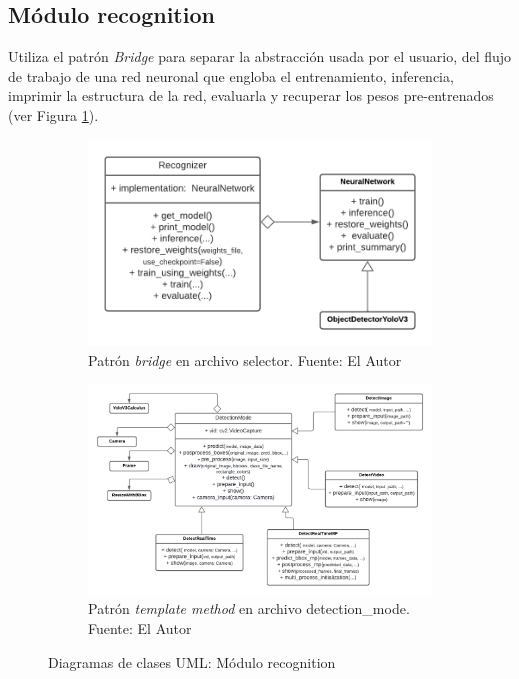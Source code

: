 \subsection{Módulo recognition}
Utiliza el patrón \textit{Bridge} para separar la abstracción usada por el usuario, del flujo de trabajo de una red neuronal que engloba el entrenamiento, inferencia, imprimir la estructura de la red, evaluarla y recuperar los pesos pre-entrenados (ver Figura \ref{bridge_uml}).
\begin{figure}[H]
     \centering
     \begin{subfigure}[b]{0.4\textwidth}
        \centering
        \includegraphics[scale=0.33]{Recursos/bridge_uml.png}
        \caption[Patrón \textit{bridge} en archivo selector.]{Patrón \textit{bridge} en archivo selector. {\footnotesize Fuente: El Autor}}
        \label{bridge_uml}
     \end{subfigure}
     \hspace{0.05em}
     \begin{subfigure}[b]{0.4\textwidth}
         \centering
        \includegraphics[scale=0.33]{Recursos/template_method_uml.png}
        \caption[Patrón \textit{template method} en archivo detection\_mode.]{Patrón \textit{template method} en archivo detection\_mode. {\footnotesize Fuente: El Autor}}
        \label{template_method_uml}
     \end{subfigure}
     \hspace{1em}
\caption{Diagramas de clases UML: Módulo recognition}
\label{recognition_umls}
\end{figure}
